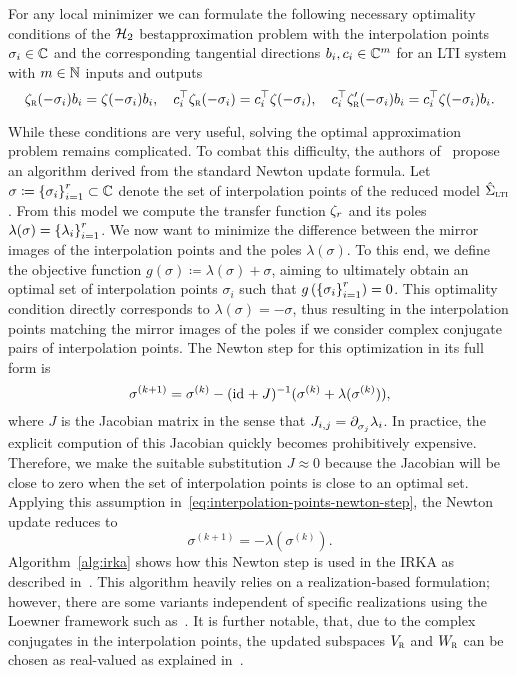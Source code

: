 For any local minimizer we can formulate the following necessary optimality conditions of the $\mcl{H}_2$ bestapproximation problem with the interpolation points $\sigma_i \in \bb{C}$ and the corresponding tangential directions $b_i, c_i \in \bb{C}^{m}$ for an \ac{LTI} system with $m \in \bb{N}$ inputs and outputs
\begin{equation*}
    \tfunc_\msc{r}(- \sigma_i) b_i = \tfunc(- \sigma_i) b_i,\quad c_i\trans \tfunc_\msc{r}(- \sigma_i) = c_i\trans \tfunc(- \sigma_i),\quad c_i\trans \tfunc'_\msc{r}(- \sigma_i) b_i = c_i\trans \tfunc(- \sigma_i) b_i.
\end{equation*}

While these conditions are very useful, solving the optimal approximation problem remains complicated.
To combat this difficulty, the authors of~\cite{Gugercin2008} propose an algorithm derived from the standard Newton update formula.
Let $\sigma \coloneqq {\sset{\sigma_i}}_{i = 1}^r \subset \bb{C}$ denote the set of interpolation points of the reduced model $\hat{\Sigma}_\msc{lti}$.
From this model we compute the transfer function $\tfunc_r$ and its poles $\lambda(\sigma) = {\sset{\lambda_i}}_{i = 1}^r$.
We now want to minimize the difference between the mirror images of the interpolation points and the poles $\lambda(\sigma)$.
To this end, we define the objective function $g(\sigma) \coloneqq \lambda(\sigma) + \sigma$, aiming to ultimately obtain an optimal set of interpolation points $\sigma_i$ such that $g\left( {\sset{\sigma_i}}_{i = 1}^r \right) = 0$.
This optimality condition directly corresponds to $\lambda(\sigma) = -\sigma$, thus resulting in the interpolation points matching the mirror images of the poles if we consider complex conjugate pairs of interpolation points.
The Newton step for this optimization in its full form is
\begin{equation}\label{eq:interpolation-points-newton-step}
    \sigma^{(k + 1)} = \sigma^{(k)} - (\id + J)\inv (\sigma^{(k)} + \lambda(\sigma^{(k)})),
\end{equation}
where $J$ is the Jacobian matrix in the sense that $J_{i, j} = \pd[\sigma_j]{} \lambda_i$.
In practice, the explicit compution of this Jacobian quickly becomes prohibitively expensive.
Therefore, we make the suitable substitution $J \approx 0$ because the Jacobian will be close to zero when the set of interpolation points is close to an optimal set.
Applying this assumption in~\eqref{eq:interpolation-points-newton-step}, the Newton update reduces to
\begin{equation*}
    \sigma^{(k + 1)} = - \lambda(\sigma^{(k)}).
\end{equation*}
Algorithm~\ref{alg:irka} shows how this Newton step is used in the \acf{IRKA} as described in~\cite[Algorithm~4.1]{Gugercin2008}.
This algorithm heavily relies on a realization-based formulation; however, there are some variants independent of specific realizations using the Loewner framework such as~\cite[Algorithm~7.2]{Beattie2017}.
It is further notable, that, due to the complex conjugates in the interpolation points, the updated subspaces $V_\msc{r}$ and $W_\msc{r}$ can be chosen as real-valued as explained in~\cite[Remark~4]{Gugercin2012}.

